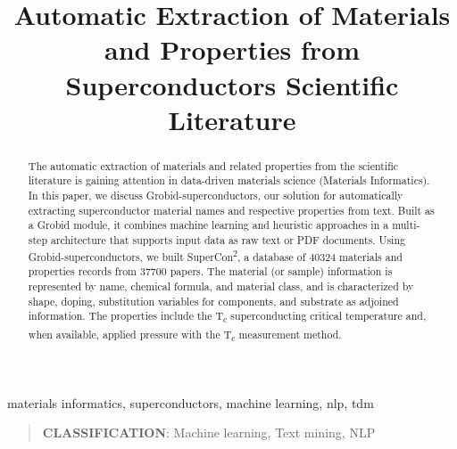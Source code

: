 \documentclass[]{interact}
\theoremstyle{plain}%
\theoremstyle{definition}
\theoremstyle{remark}
\begin{document}

\title{Automatic Extraction of Materials and Properties from Superconductors Scientific Literature}
\maketitle
\author{
}




\begin{abstract}
    The automatic extraction of materials and related properties from the scientific literature is gaining attention in data-driven materials science (Materials Informatics).
    In this paper, we discuss Grobid-superconductors, our solution for automatically extracting superconductor material names and respective properties from text.
    Built as a Grobid module, it combines machine learning and heuristic approaches in a multi-step architecture that supports input data as raw text or PDF documents.
    Using Grobid-superconductors, we built SuperCon\textsuperscript{2}, a database of 40324 materials and properties records from 37700 papers.
    The material (or sample) information is represented by name, chemical formula, and material class, and is characterized by shape, doping, substitution variables for components, and substrate as adjoined information.
    The properties include the T\textsubscript{c} superconducting critical temperature and, when available, applied pressure with the T\textsubscript{c} measurement method.
\end{abstract}

\begin{keywords}
    materials informatics, superconductors, machine learning, nlp, tdm
\end{keywords}

\begin{quote}
    \textbf{CLASSIFICATION}: Machine learning, Text mining, NLP
\end{quote}
\end{document}
